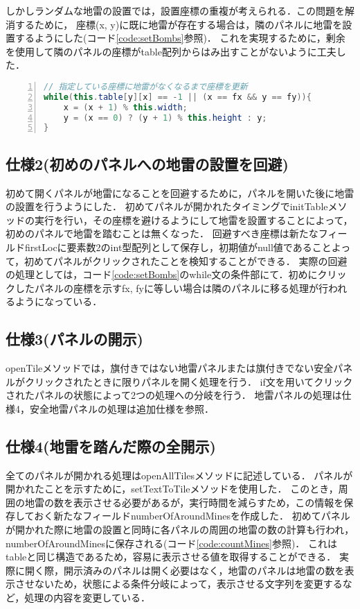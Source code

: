 \documentclass{jlreq}
\begin{document}
しかしランダムな地雷の設置では，設置座標の重複が考えられる．この問題を解消するために，
座標(x, y)に既に地雷が存在する場合は，隣のパネルに地雷を設置するようにした(コード\ref{code:setBombs}参照)．
これを実現するために，剰余を使用して隣のパネルの座標がtable配列からはみ出すことがないように工夫した．

\begin{lstlisting}[caption=Javaソースコード,label=code:setBombs,language=java,frame={tb},breaklines=true,lineskip=-0.5ex,numbers=left,stringstyle={\small\ttfamily}]
// 指定している座標に地雷がなくなるまで座標を更新
while(this.table[y][x] == -1 || (x == fx && y == fy)){
    x = (x + 1) % this.width;
    y = (x == 0) ? (y + 1) % this.height : y;
}
\end{lstlisting}

\subsection{仕様2(初めのパネルへの地雷の設置を回避)}
初めて開くパネルが地雷になることを回避するために，パネルを開いた後に地雷の設置を行うようにした．
初めてパネルが開かれたタイミングでinitTableメソッドの実行を行い，その座標を避けるようにして地雷を設置することによって，初めのパネルで地雷を踏むことは無くなった．
回避すべき座標は新たなフィールドfirstLocに要素数2のint型配列として保存し，初期値がnull値であることよって，初めてパネルがクリックされたことを検知することができる．
実際の回避の処理としては，コード\ref{code:setBombs}のwhile文の条件部にて．初めにクリックしたパネルの座標を示すfx, fyに等しい場合は隣のパネルに移る処理が行われるようになっている．

\subsection{仕様3(パネルの開示)}
openTileメソッドでは，旗付きではない地雷パネルまたは旗付きでない安全パネルがクリックされたときに限りパネルを開く処理を行う．
if文を用いてクリックされたパネルの状態によって2つの処理への分岐を行う．
地雷パネルの処理は仕様4，安全地雷パネルの処理は追加仕様を参照．


\subsection{仕様4(地雷を踏んだ際の全開示)}
全てのパネルが開かれる処理はopenAllTilesメソッドに記述している．
パネルが開かれたことを示すために，setTextToTileメソッドを使用した．
このとき，周囲の地雷の数を表示させる必要があるが，実行時間を減らすため，この情報を保存しておく新たなフィールドnumberOfAroundMinesを作成した．
初めてパネルが開かれた際に地雷の設置と同時に各パネルの周囲の地雷の数の計算も行われ，numberOfAroundMinesに保存される(コード\ref{code:countMines}参照)．
これはtableと同じ構造であるため，容易に表示させる値を取得することができる．
実際に開く際，開示済みのパネルは開く必要はなく，地雷のパネルは地雷の数を表示させないため，状態による条件分岐によって，表示させる文字列を変更するなど，処理の内容を変更している．
\end{document}
